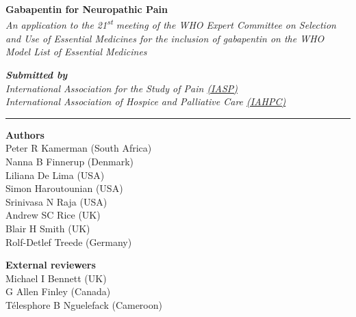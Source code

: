 \documentclass[11pt]{article}
\begin{document}
\thispagestyle{empty}

\begin{center}
\LARGE{\textbf{Gabapentin for Neuropathic Pain}}\\
\vspace{10mm}
\large{\textit{An application to the 21\textsuperscript{st} meeting of the WHO Expert Committee on Selection and Use of Essential Medicines for the inclusion of gabapentin on the WHO Model List of Essential Medicines}}\\

\vspace{10mm}

\normalsize{\textit{
\textbf{Submitted by}\\
International Association for the Study of Pain \href{http://www.iasp-pain.org}{(IASP)}\footnotemark
\\ International Association of Hospice and Palliative Care \href{http://hospicecare.com/home/}{(IAHPC)}}}
\rule{0.5\textwidth}{.4pt}
\end{center}


\vspace{10mm}

\begin{minipage}[t]{0.6\textwidth} %
\textbf{Authors}\\
Peter R Kamerman (South Africa)\footnotemark \\
Nanna B Finnerup (Denmark)\\
Liliana De Lima (USA)\\
Simon Haroutounian (USA)\\
Srinivasa N Raja (USA)\\
Andrew SC Rice (UK)\\
Blair H Smith (UK)\\
Rolf-Detlef Treede (Germany)
\end{minipage}
\begin{minipage}[t]{0.5\textwidth}
\textbf{External reviewers}\\
Michael I Bennett (UK)\\
G Allen Finley (Canada)\\
T\'{e}lesphore B Nguelefack (Cameroon)
\end{minipage}

\vspace{20mm}
\end{document}

